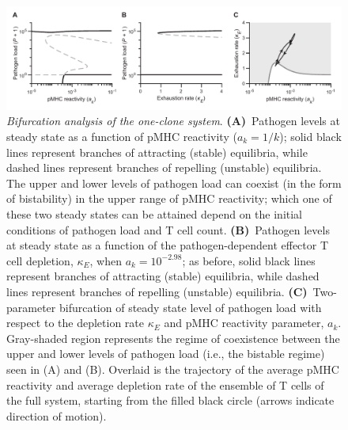 \begin{figure}
    \centering
    \includegraphics[width=\textwidth]{Figures/AvC/figS2_bfns.pdf}
    \caption[Bifurcation analysis of the one-clone system]{\textit{Bifurcation analysis of the one-clone system}. %
    \textbf{(A)}~Pathogen levels at steady state as a function of pMHC reactivity ($a_k=1/k$); solid black lines represent branches of attracting (stable) equilibria, while dashed lines represent branches of repelling (unstable) equilibria. The upper and lower levels of pathogen load can coexist (in the form of bistability) in the upper range of pMHC reactivity; which one of these two steady states can be attained depend on the initial conditions of pathogen load and T cell count. %
    \textbf{(B)}~Pathogen levels at steady state as a function of the pathogen-dependent effector T cell depletion, $\kappa_E$, when $a_k=10^{-2.98}$; as before, solid black lines represent branches of attracting (stable) equilibria, while dashed lines represent branches of repelling (unstable) equilibria. %
    \textbf{(C)}~Two-parameter bifurcation of steady state level of pathogen load with respect to the depletion rate $\kappa_E$ and pMHC reactivity parameter, $a_k$. Gray-shaded region represents the regime of coexistence between the upper and lower levels of pathogen load (i.e., the bistable regime) seen in (A) and (B). Overlaid is the trajectory of the average pMHC reactivity and average depletion rate of the ensemble of T cells of the full system, starting from the filled black circle (arrows indicate direction of motion).}
    \label{fig:AvC_supp_bfns}
\end{figure}

